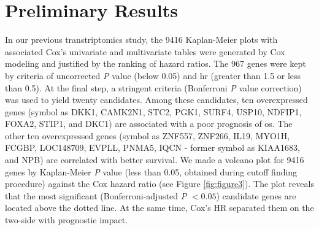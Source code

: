 \documentclass[12pt, a4paper]{article}
\begin{document}
\section{Preliminary Results}
In our previous transtriptomics study\citep{Chi2020}, %
the 9416 Kaplan-Meier plots with associated Cox's univariate and multivariate tables were generated by Cox modeling %
and justified by the ranking of hazard ratios.
The 967 genes were kept by criteria of uncorrected \textit{P} value (below 0.05) and \acrfull{hr} (greater than 1.5 or less than 0.5). %
At the final step, a stringent criteria (Bonferroni \textit{P} value correction) was used to yield twenty candidates. %
Among these candidates, ten overexpressed genes (symbol as DKK1, CAMK2N1, STC2, PGK1, SURF4, USP10, NDFIP1, FOXA2, STIP1, and DKC1) are associated with a poor prognosis of  \acrshort{os}.%
The other ten overexpressed genes (symbol as ZNF557, ZNF266, IL19, MYO1H, FCGBP, LOC148709, EVPLL, PNMA5, IQCN - former symbol as KIAA1683, and NPB) are correlated with better survival.%
We made a volcano plot for 9416 genes by Kaplan-Meier \textit{P} value (less than 0.05, obtained during cutoff finding procedure) against the Cox hazard ratio (see Figure \ref{fig:figure3}). The plot reveals that the most significant (Bonferroni-adjusted \textit{P} $< 0.05$) candidate genes are located above the dotted line. At the same time, Cox's HR separated them on the two-side with prognostic impact.
\end{document}

